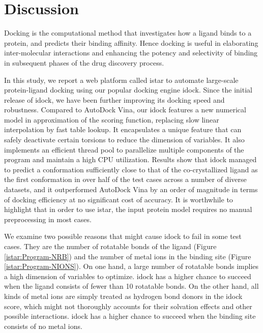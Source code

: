 \section{Discussion}

Docking is the computational method that investigates how a ligand binds to a protein, and predicts their binding affinity. Hence docking is useful in elaborating inter-molecular interactions and enhancing the potency and selectivity of binding in subsequent phases of the drug discovery process.

In this study, we report a web platform called istar to automate large-scale protein-ligand docking using our popular docking engine idock. Since the initial release of idock, we have been further improving its docking speed and robustness. Compared to AutoDock Vina, our idock features a new numerical model in approximation of the scoring function, replacing slow linear interpolation by fast table lookup. It encapsulates a unique feature that can safely deactivate certain torsions to reduce the dimension of variables. It also implements an efficient thread pool to parallelize multiple components of the program and maintain a high CPU utilization. Results show that idock managed to predict a conformation sufficiently close to that of the co-crystallized ligand as the first conformation in over half of the test cases across a number of diverse datasets, and it outperformed AutoDock Vina by an order of magnitude in terms of docking efficiency at no significant cost of accuracy. It is worthwhile to highlight that in order to use istar, the input protein model requires no manual preprocessing in most cases.

We examine two possible reasons that might cause idock to fail in some test cases. They are the number of rotatable bonds of the ligand (Figure \ref{istar:Program-NRB}) and the number of metal ions in the binding site (Figure \ref{istar:Program-NIONS}). On one hand, a large number of rotatable bonds implies a high dimension of variables to optimize. idock has a higher chance to succeed when the ligand consists of fewer than 10 rotatable bonds. On the other hand, all kinds of metal ions are simply treated as hydrogen bond donors in the idock score, which might not thoroughly accounts for their solvation effects and other possible interactions. idock has a higher chance to succeed when the binding site consists of no metal ions.

